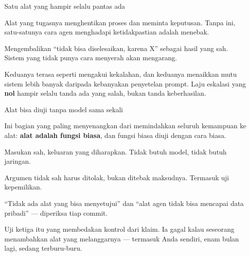 \documentclass[aspectratio=169,11pt,t]{beamer}
\begin{document}
\begin{frame}[shrink=25]{Satu alat yang hampir selalu pantas ada}
\begin{minipage}[t]{0.494\textwidth}
\begin{icardaccent}
Alat yang tugasnya menghentikan proses dan meminta keputusan. Tanpa ini, satu-satunya cara agen menghadapi ketidakpastian adalah menebak.
\end{icardaccent}
\end{minipage}%
\hfill
\begin{minipage}[t]{0.494\textwidth}
\begin{icardaccent}
Mengembalikan ``tidak bisa diselesaikan, karena X'' sebagai hasil yang sah. Sistem yang tidak punya cara menyerah akan mengarang.
\end{icardaccent}
\end{minipage}%
{\fontsize{9.4}{12.6}\selectfont\color{fg2}Keduanya terasa seperti mengakui kekalahan, dan keduanya menaikkan mutu sistem lebih banyak daripada kebanyakan penyetelan prompt. Laju eskalasi yang \textbf{nol} hampir selalu tanda ada yang salah, bukan tanda keberhasilan.\par}\vskip 4pt
\end{frame}

\begin{frame}[shrink=25]{Alat bisa diuji tanpa model sama sekali}
{\fontsize{9.4}{12.6}\selectfont\color{fg2}Ini bagian yang paling menyenangkan dari memindahkan seluruh kemampuan ke alat: \textbf{alat adalah fungsi biasa}, dan fungsi biasa diuji dengan cara biasa.\par}\vskip 4pt
\begin{minipage}[t]{0.3253\textwidth}
\begin{icardgood}
Masukan sah, keluaran yang diharapkan. Tidak butuh model, tidak butuh jaringan.
\end{icardgood}
\end{minipage}%
\hfill
\begin{minipage}[t]{0.3253\textwidth}
\begin{icardgood}
Argumen tidak sah harus ditolak, bukan ditebak maksudnya. Termasuk uji kepemilikan.
\end{icardgood}
\end{minipage}%
\hfill
\begin{minipage}[t]{0.3253\textwidth}
\begin{icardgood}
``Tidak ada alat yang bisa menyetujui'' dan ``alat agen tidak bisa mencapai data pribadi'' --- diperiksa tiap commit.
\end{icardgood}
\end{minipage}%
\begin{iband}[signal]
Uji ketiga itu yang membedakan kontrol dari klaim. Ia gagal kalau seseorang menambahkan alat yang melanggarnya --- termasuk Anda sendiri, enam bulan lagi, sedang terburu-buru.
\end{iband}
\end{frame}
\end{document}
